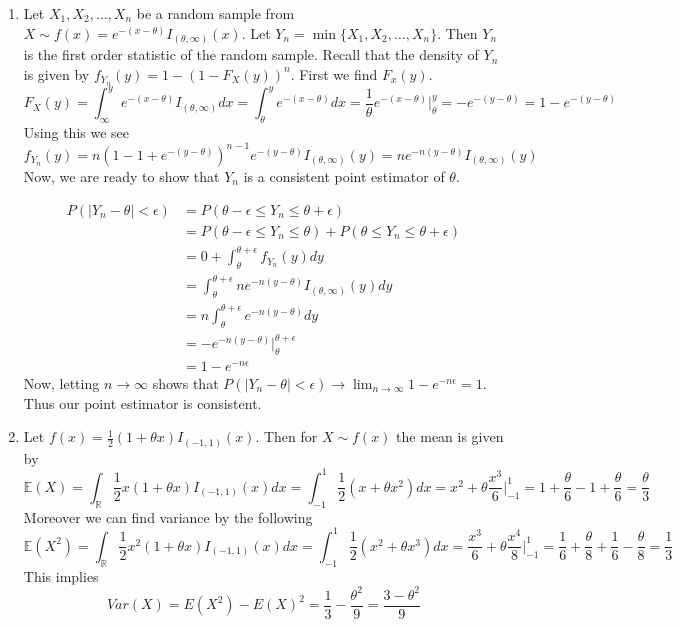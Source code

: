 \documentclass[12pt]{article}  %
\newcommand{\R}{{\mathbb{R}}}
\newcommand{\e}{{\epsilon}}
\newcommand{\E}{{\mathbb{E}}}
\begin{document}
\begin{enumerate}

\item Let $X_1, X_2, \ldots, X_n$ be a random sample from $X\sim f(x) = e^{-(x-\theta)}I_{(\theta,\infty)}(x)$. Let $Y_n = \min\{X_1, X_2, \ldots, X_n\}$. Then $Y_n$ is the first order statistic of the random sample. Recall that the density of $Y_n$ is given by $f_{Y_n}(y) =1 - (1 - F_X(y))^n$. First we find $F_{x}(y)$. 
$$F_{X}(y) = \int_{\infty}^{y}e^{-(x-\theta)}I_{(\theta, \infty)}dx = \int_{\theta}^{y}e^{-(x-\theta)}dx = \frac{1}{\theta}e^{-(x-\theta)}\bigg|_{\theta}^{y} = -e^{-(y-\theta)}  = 1 - e^{-(y-\theta)}$$
Using this we see $$f_{Y_n}(y) = n(1 - 1 + e^{-(y-\theta)})^{n-1}e^{-(y-\theta)}I_{(\theta,\infty)}(y) = ne^{-n(y-\theta)}I_{(\theta,\infty)}(y)$$ Now, we are ready to show that $Y_n$ is a consistent point estimator of $\theta$. 

\begin{align*}
P(|Y_n - \theta|<\e) &= P(\theta - \e \leq Y_n \leq \theta + \e)\\
&= P(\theta - \e \leq Y_n \leq \theta) + P(\theta \leq Y_n \leq \theta + \e)\\
&= 0 + \int_{\theta}^{\theta+\e}f_{Y_n}(y)dy\\
&= \int_{\theta}^{\theta+\e}ne^{-n(y-\theta)}I_{(\theta,\infty)}(y)dy\\
&= n \int_{\theta}^{\theta + \e}e^{-n(y-\theta)}dy\\
&= -e^{-n(y-\theta)}\bigg|_{\theta}^{\theta+\e}\\
&= 1 - e^{-n\e}
\end{align*}
Now, letting $n\to\infty$ shows that $P(|Y_n - \theta|<\e) \to \lim_{n\to\infty}1 - e^{-n\e} = 1$. Thus our point estimator is consistent. 

\item Let $f(x) = \frac{1}{2}(1+ \theta x)I_{(-1,1)}(x)$. Then for $X\sim f(x)$ the mean is given by $$\E(X) = \int_{\R}\frac{1}{2}x(1 + \theta x)I_{(-1,1)}(x)dx = \int_{-1}^{1}\frac{1}{2}(x+\theta x^2)dx = x^2 + \theta\frac{x^3}{6}\bigg |_{-1}^{1} = 1 + \frac{\theta}{6} - 1 + \frac{\theta}{6} = \frac{\theta}{3}$$
Moreover we can find variance by the following $$\E(X^2) = \int_{\R}\frac{1}{2}x^2(1 + \theta x)I_{(-1,1)}(x)dx = \int_{-1}^{1}\frac{1}{2}(x^2+\theta x^3)dx =\frac{x^3}{6} + \theta\frac{x^4}{8}\bigg |_{-1}^{1} = \frac{1}{6} + \frac{\theta}{8} +\frac{1}{6} - \frac{\theta}{8} = \frac{1}{3}$$ This implies $$Var(X) = E(X^2) - E(X)^2 = \frac{1}{3} - \frac{\theta^2}{9} = \frac{3 - \theta^2}{9}$$


\end{enumerate}
\end{document}
